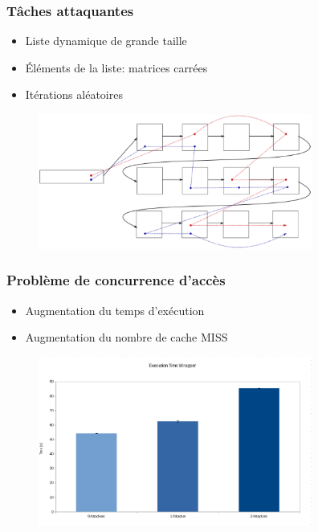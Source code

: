 \documentclass{beamer}
\begin{document}
    \begin{frame}[label=attaquants]
        \frametitle{Tâches attaquantes}
        \begin{itemize}
            \item Liste dynamique de grande taille
            \item Éléments de la liste: matrices carrées
            \item Itérations aléatoires
        \end{itemize}
        \begin{figure}
            \includegraphics[width=9cm]{doc/psar_attaquants.eps}
        \end{figure}

    \end{frame}
    
    \begin{frame}[label=concurrence]
        \frametitle{Problème de concurrence d'accès}
        \begin{itemize}
            \item Augmentation du temps d'exécution
            \item Augmentation du nombre de cache MISS
        \end{itemize}
        \begin{figure}
            \includegraphics[width=9cm]{doc/graphes/benchmark_wrapper_performance.eps}
        \end{figure}
    \end{frame}
\end{document}
